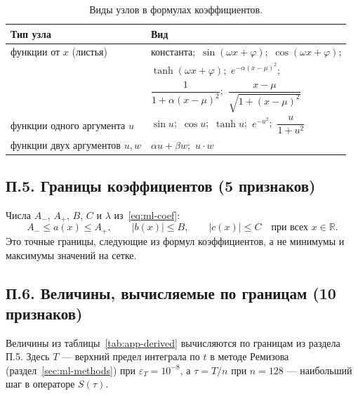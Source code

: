 \documentclass[14pt,a4paper]{extarticle}
\begin{document}
\begin{table}[!htbp]
\centering
\caption{Виды узлов в формулах коэффициентов.}
\label{tab:app-ops}
\renewcommand{\arraystretch}{1.3}
\begin{tabular}{>{\raggedright\arraybackslash}p{}l}
\toprule
Тип узла & Вид\\
\midrule
функции от $x$ (листья) & константа;\ $\sin(\omega x+\varphi)$;\ $\cos(\omega x+\varphi)$;\\
 & $\tanh(\omega x+\varphi)$;\ $e^{-\alpha(x-\mu)^2}$;\\
 & $\dfrac{1}{1+\alpha(x-\mu)^2}$;\ $\dfrac{x-\mu}{\sqrt{1+(x-\mu)^2}}$\\
\midrule
функции одного аргумента $u$ & $\sin u$;\ $\cos u$;\ $\tanh u$;\ $e^{-u^2}$;\ $\dfrac{u}{1+u^2}$\\
\midrule
функции двух аргументов $u,w$ & $\alpha u+\beta w$;\ $u\cdot w$\\
\bottomrule
\end{tabular}
\end{table}

\subsection*{П.5. Границы коэффициентов (5 признаков)}
Числа $A_-$, $A_+$, $B$, $C$ и $\lambda$ из~\eqref{eq:ml-coef}:
\[
A_-\le a(x)\le A_+,\qquad |b(x)|\le B,\qquad |c(x)|\le C
\quad\text{при всех } x\in\mathbb R.
\]
Это точные границы, следующие из формул коэффициентов, а не минимумы
и максимумы значений на сетке.

\subsection*{П.6. Величины, вычисляемые по границам (10 признаков)}
Величины из таблицы~\ref{tab:app-derived} вычисляются по границам
из раздела П.5. Здесь $T$ --- верхний предел интеграла по $t$ в методе
Ремизова (раздел~\ref{sec:ml-methods}) при $\varepsilon_T=10^{-8}$,
а $\tau=T/n$ при $n=128$ --- наибольший шаг в операторе $S(\tau)$.
\end{document}
